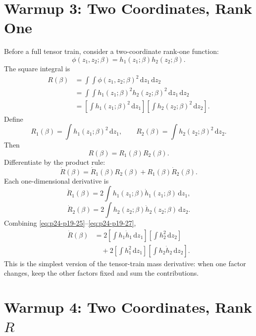\documentclass[11pt]{article}
\newcommand{\dd}{\,\mathrm d}
\begin{document}
\section{Warmup 3: Two Coordinates, Rank One}

Before a full tensor train, consider a two-coordinate rank-one function:
\[
    \phi(z_1,z_2;\beta)=h_1(z_1;\beta)h_2(z_2;\beta).
    \label{eq:p24-p19-21}
\]
The square integral is
\[
\begin{aligned}
    R(\beta)
    &=
    \int\!\!\int
    \phi(z_1,z_2;\beta)^2\dd z_1\dd z_2\\
    &=
    \int\!\!\int
    h_1(z_1;\beta)^2h_2(z_2;\beta)^2\dd z_1\dd z_2\\
    &=
    \left[\int h_1(z_1;\beta)^2\dd z_1\right]
    \left[\int h_2(z_2;\beta)^2\dd z_2\right].
\end{aligned}
\label{eq:p24-p19-22}
\]
Define
\[
    R_1(\beta)=\int h_1(z_1;\beta)^2\dd z_1,
    \qquad
    R_2(\beta)=\int h_2(z_2;\beta)^2\dd z_2.
    \label{eq:p24-p19-23}
\]
Then
\[
    R(\beta)=R_1(\beta)R_2(\beta).
    \label{eq:p24-p19-24}
\]
Differentiate by the product rule:
\[
    \dot R(\beta)=\dot R_1(\beta)R_2(\beta)+R_1(\beta)\dot R_2(\beta).
    \label{eq:p24-p19-25}
\]
Each one-dimensional derivative is
\[
    \dot R_1(\beta)=2\int h_1(z_1;\beta)\dot h_1(z_1;\beta)\dd z_1,
    \label{eq:p24-p19-26}
\]
\[
    \dot R_2(\beta)=2\int h_2(z_2;\beta)\dot h_2(z_2;\beta)\dd z_2.
    \label{eq:p24-p19-27}
\]
Combining \eqref{eq:p24-p19-25}--\eqref{eq:p24-p19-27},
\[
\begin{aligned}
    \dot R(\beta)
    &=
    2
    \left[\int h_1\dot h_1\dd z_1\right]
    \left[\int h_2^2\dd z_2\right]\\
    &\quad+
    2
    \left[\int h_1^2\dd z_1\right]
    \left[\int h_2\dot h_2\dd z_2\right].
\end{aligned}
\label{eq:p24-p19-28}
\]
This is the simplest version of the tensor-train mass derivative: when one
factor changes, keep the other factors fixed and sum the contributions.

\section{Warmup 4: Two Coordinates, Rank \texorpdfstring{\(R\)}{R}}
\end{document}
